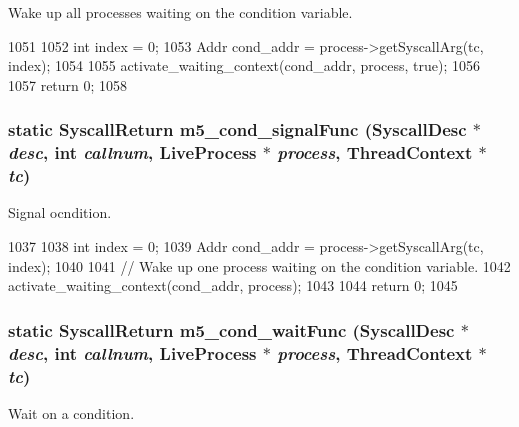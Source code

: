 Wake up all processes waiting on the condition variable. 


\begin{DoxyCode}
1051     {
1052         int index = 0;
1053         Addr cond_addr = process->getSyscallArg(tc, index);
1054 
1055         activate_waiting_context(cond_addr, process, true);
1056 
1057         return 0;
1058     }
\end{DoxyCode}
\hypertarget{classTru64_acfc803d4984b3037abb896038e4f6fc1}{
\subsubsection[{m5\_\-cond\_\-signalFunc}]{\setlength{\rightskip}{0pt plus 5cm}static {\bf SyscallReturn} m5\_\-cond\_\-signalFunc ({\bf SyscallDesc} $\ast$ {\em desc}, \/  int {\em callnum}, \/  {\bf LiveProcess} $\ast$ {\em process}, \/  {\bf ThreadContext} $\ast$ {\em tc})}}
\label{classTru64_acfc803d4984b3037abb896038e4f6fc1}


Signal ocndition. 


\begin{DoxyCode}
1037     {
1038         int index = 0;
1039         Addr cond_addr = process->getSyscallArg(tc, index);
1040 
1041         // Wake up one process waiting on the condition variable.
1042         activate_waiting_context(cond_addr, process);
1043 
1044         return 0;
1045     }
\end{DoxyCode}
\hypertarget{classTru64_a2c38b28b551cfcfe04f70cbfbff3a55e}{
\subsubsection[{m5\_\-cond\_\-waitFunc}]{\setlength{\rightskip}{0pt plus 5cm}static {\bf SyscallReturn} m5\_\-cond\_\-waitFunc ({\bf SyscallDesc} $\ast$ {\em desc}, \/  int {\em callnum}, \/  {\bf LiveProcess} $\ast$ {\em process}, \/  {\bf ThreadContext} $\ast$ {\em tc})}}
\label{classTru64_a2c38b28b551cfcfe04f70cbfbff3a55e}


Wait on a condition. 


